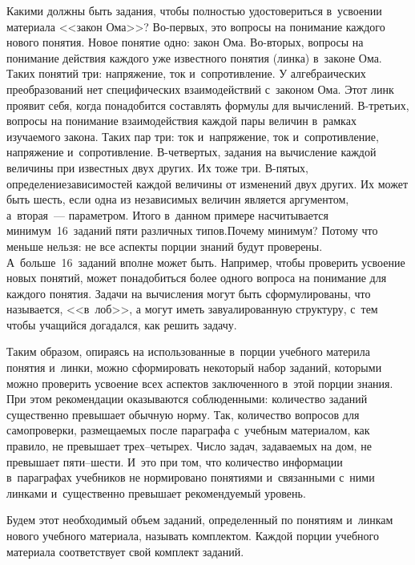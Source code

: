 \begin{multicols}{2}
  Какими должны быть задания, чтобы пол\-ностью удостовериться в~усвоении 
материала <<закон Ома>>? Во-пер\-вых, это вопросы на понимание каж\-до\-го 
нового понятия. Новое понятие одно: закон Ома. Во-вто\-рых, вопросы на 
понимание действия каждого уже известного понятия (линка) в~законе Ома. 
Таких понятий три: напряжение, ток и~сопротивление. У алгебраических 
преобразований нет специфических взаимодействий с~законом Ома. Этот линк 
проявит себя, когда понадобится со\-став\-лять формулы для вычислений.  
В-третьих, вопросы на понимание взаимодействия каждой пары величин 
в~рамках изучаемого закона. Таких пар три: ток и~напряжение, ток 
и~сопротивление, напряжение и~сопротивление. В-чет\-вер\-тых, задания на 
вычисление каждой величины при известных двух %
 других. Их тоже три.  
В-пя\-тых, определение\linebreak зависимостей каждой величины от изменений двух 
других. Их может быть шесть, если одна из независимых величин является 
аргументом, а~вторая~--- параметром. Итого в~данном примере насчитывается 
минимум~16~заданий пяти различных типов.\linebreak Почему минимум? Потому что 
меньше нельзя: не все аспекты порции знаний будут проверены. 
А~больше~16~заданий вполне может быть. Например, чтобы проверить 
усвоение новых понятий, может понадобиться более одного вопроса на 
понимание для каждого понятия. Задачи на вычисления могут быть 
сформулированы, что называется, <<в~лоб>>, а могут иметь завуалированную 
структуру, с~тем чтобы учащийся догадался, как решить задачу. 
  
  Таким образом, опираясь на использованные в~порции учебного материла 
понятия и~линки, можно сформировать некоторый набор заданий, которыми 
можно проверить усвоение всех аспектов заключенного в~этой порции знания. 
При этом рекомендации оказываются соблюденными: количество заданий 
существенно превышает обычную норму. Так, количество вопросов для 
самопроверки, размещаемых после параграфа с~учебным материалом, как 
правило, не превышает трех--че\-ты\-рех. Число задач, задаваемых на дом, не 
превышает пяти--шести. И~это при том, что количество информации 
в~параграфах учебников не нормировано понятиями и~связанными с~ними 
линками и~существенно превышает рекомендуемый уровень.
  
  Будем этот необходимый объем заданий, определенный по понятиям 
и~линкам нового учебного материала, называть комплектом. Каждой порции 
учебного материала соответствует свой комплект заданий.
  

\end{multicols}
